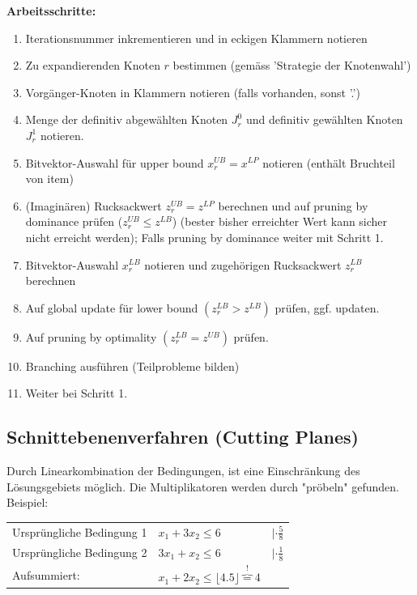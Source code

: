 \textbf{Arbeitsschritte:}
\begin{enumerate}
	\item Iterationsnummer inkrementieren und in eckigen Klammern notieren
	\item Zu expandierenden Knoten $r$ bestimmen (gemäss 'Strategie der Knotenwahl')
	\item Vorgänger-Knoten in Klammern notieren (falls vorhanden, sonst '.')
	\item Menge der definitiv abgewählten Knoten $J^0_r$ und definitiv gewählten Knoten $J^1_r$ notieren.
	\item Bitvektor-Auswahl für upper bound $x_r^{UB}=x^{LP}$ notieren (enthält Bruchteil von item)
	\item (Imaginären) Rucksackwert $z_r^{UB}=z^{LP}$ berechnen und auf pruning by dominance prüfen ($z_r^{UB}\le z^{LB}$) (bester bisher erreichter Wert kann sicher nicht erreicht werden); Falls pruning by dominance weiter mit Schritt 1.
	\item Bitvektor-Auswahl $x_r^{LB}$ notieren und zugehörigen Rucksackwert $z_r^{LB}$ berechnen
	\item Auf global update für lower bound $(z_r^{LB} > z^{LB})$ prüfen, ggf. updaten.
	\item Auf pruning by optimality $(z_r^{LB} = z^{UB})$ prüfen.
	\item Branching ausführen (Teilprobleme bilden)
	\item Weiter bei Schritt 1.
\end{enumerate}

\subsection{Schnittebenenverfahren (Cutting Planes) }  
	
	Durch Linearkombination der Bedingungen, ist eine Einschränkung des Lösungsgebiets möglich. Die Multiplikatoren werden durch "pröbeln" gefunden. Beispiel:
	
	\begin{tabular}{p{8cm} p{4cm} p{3cm}}
		Ursprüngliche Bedingung 1 & $x_1 + 3 x_2 \leq 6$ & $| \cdot \frac{5}{8}$\\
		Ursprüngliche Bedingung 2 & $3 x_1 + x_2 \leq 6$ & $| \cdot \frac{1}{8}$  \\
		Aufsummiert: & $x_1 + 2 x_2 \leq \lfloor 4.5 \rfloor \overbrace{=}^{!} 4$ \\
	\end{tabular}
